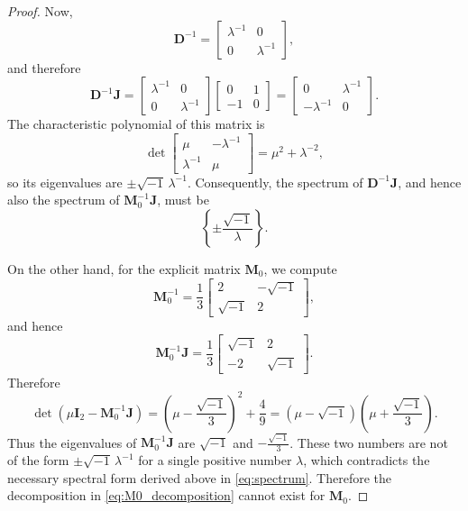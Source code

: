 \documentclass[pdflatex,sn-mathphys-ay]{sn-jnl}
\newcommand{\M}[1]{\bm{#1}}     %
\theoremstyle{thmstyleone}
\theoremstyle{thmstyletwo}
\theoremstyle{thmstylethree}
\numberwithin{equation}{section}
\begin{document}
\begin{proof}
Now,
$$
\M{D}^{-1} =
\begin{bmatrix}
\lambda^{-1} & 0 \\
0 & \lambda^{-1}
\end{bmatrix},
$$
and therefore
$$
\M{D}^{-1}\M{J}
=
\begin{bmatrix}
\lambda^{-1} & 0 \\
0 & \lambda^{-1}
\end{bmatrix}
\begin{bmatrix}
0 & 1 \\
-1 & 0
\end{bmatrix}
=
\begin{bmatrix}
0 & \lambda^{-1} \\
-\lambda^{-1} & 0
\end{bmatrix}.
$$
The characteristic polynomial of this matrix is
$$
\det
\begin{bmatrix}
\mu & -\lambda^{-1} \\
\lambda^{-1} & \mu
\end{bmatrix}
=
\mu^2 + \lambda^{-2},
$$
so its eigenvalues are $\pm \sqrt{-1}\,\lambda^{-1}$. Consequently, the spectrum of $\M{D}^{-1}\M{J}$, and hence also the spectrum of $\M{M}_0^{-1}\M{J}$, must be
\begin{equation}\label{eq:spectrum}
\left\{
\pm \frac{\sqrt{-1}}{\lambda}
\right\}.
\end{equation}

On the other hand, for the explicit matrix $\M{M}_0$, we compute
$$
\M{M}_0^{-1}
=
\frac{1}{3}
\begin{bmatrix}
2 & -\sqrt{-1} \\
\sqrt{-1} & 2
\end{bmatrix},
$$
and hence
$$
\M{M}_0^{-1}\M{J}
=
\frac{1}{3}
\begin{bmatrix}
\sqrt{-1} & 2 \\
-2 & \sqrt{-1}
\end{bmatrix}.
$$
Therefore
$$
\det\left(\mu \M{I}_2 - \M{M}_0^{-1}\M{J}\right)
=
\left(\mu - \frac{\sqrt{-1}}{3}\right)^2 + \frac{4}{9}
=
(\mu - \sqrt{-1})\left(\mu + \frac{\sqrt{-1}}{3}\right).
$$
Thus the eigenvalues of $\M{M}_0^{-1}\M{J}$ are $\sqrt{-1}$ and $-\frac{\sqrt{-1}}{3}$. These two numbers are not of the form $\pm \sqrt{-1}\,\lambda^{-1}$ for a single positive number $\lambda$, which contradicts the necessary spectral form derived above in \eqref{eq:spectrum}. 
Therefore the decomposition in \eqref{eq:M0_decomposition} cannot exist for $\M{M}_0$.
\end{proof}
\end{document}
